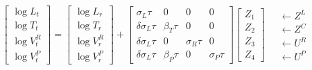 \documentclass{article}
\begin{document}
\begin{align}
\begin{bmatrix}
    \log L_t \\ \log T_t \\ \log V^R_t \\ \log V^P_t 
\end{bmatrix}
=
\begin{bmatrix}
    \log L_r \\ \log T_r \\ \log V^R_r \\ \log V^P_r 
\end{bmatrix}
+
\begin{bmatrix}
    \sigma_L \tau &  0  & 0  & 0  \\
    \delta \sigma_L \tau  &  \beta_T \tau  & 0  &   0 \\
    \delta \sigma_L \tau  &  0        & \sigma_R \tau  &   0 \\
    \delta \sigma_L \tau  &  \beta_P \tau  & 0  &   \sigma_P\tau  
\end{bmatrix}
\begin{bmatrix}
    Z_1 \\ Z_2 \\ Z_3 \\ Z_4
\end{bmatrix}
\quad \begin{matrix}
    \leftarrow Z^L \\
    \leftarrow Z^C \\
    \leftarrow U^R \\
    \leftarrow U^P 
\end{matrix}
\end{align}
\end{document}
